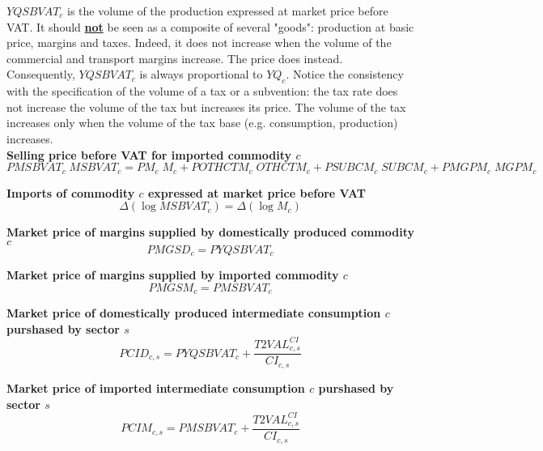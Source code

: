 \documentclass[12pt]{article}
\numberwithin{equation}{section}
\begin{document}
$YQSBVAT_{c}$ is the volume of the production expressed at market price before VAT. It should \textbf{\underline{not}} be seen as a composite of several "goods": production at basic price, margins and taxes. Indeed, it does not increase when the volume of the commercial and transport margins increase. The price does instead. Consequently, $YQSBVAT_{c}$ is always proportional to $YQ_{c}$. Notice the consistency with the specification of the volume of a tax or a subvention: the tax rate does not increase the volume of the tax but increases its price. The volume of the tax increases only when the volume of the tax base (e.g. consumption, production) increases. \\

\noindent \textbf{Selling price before VAT for imported commodity $c$} 
\begin{dmath}
PMSBVAT_{c} \; MSBVAT_{c} = PM_{c} \; M_{c} + POTHCTM_{c} \; OTHCTM_{c} + PSUBCM_{c} \; SUBCM_{c} + PMGPM_{c} \; MGPM_{c}
\label{Exception_taxes_prices.mdlPMSBVAT[c]}
\end{dmath}

\noindent \textbf{Imports of commodity $c$ expressed at market price before VAT} 
\begin{dmath}
\varDelta \left(\operatorname{log} MSBVAT_{c}\right) = \varDelta \left(\operatorname{log} M_{c}\right)
\label{Exception_taxes_prices.mdlMSBVAT[c]}
\end{dmath}

\noindent \textbf{Market price of margins supplied by domestically produced commodity $c$} 
\begin{dmath}
PMGSD_{c} = PYQSBVAT_{c}
\label{Exception_taxes_prices.mdlPMGSD[c]}
\end{dmath}

\noindent \textbf{Market price of margins supplied by imported commodity $c$} 
\begin{dmath}
PMGSM_{c} = PMSBVAT_{c}
\label{Exception_taxes_prices.mdlPMGSM[c]}
\end{dmath}

\noindent \textbf{Market price of domestically produced intermediate consumption $c$ purshased by sector $s$} 
\begin{dmath}
PCID_{c, s} = PYQSBVAT_{c} + \frac{T2VAL^{CI}_{c, s}}{CI_{c, s}}
\label{Exception_taxes_prices.mdlPCID[c, s]}
\end{dmath}

\noindent \textbf{Market price of imported intermediate consumption $c$ purshased by sector $s$} 
\begin{dmath}
PCIM_{c, s} = PMSBVAT_{c} + \frac{T2VAL^{CI}_{c, s}}{CI_{c, s}}
\label{Exception_taxes_prices.mdlPCIM[c, s]}
\end{dmath}
\end{document}
